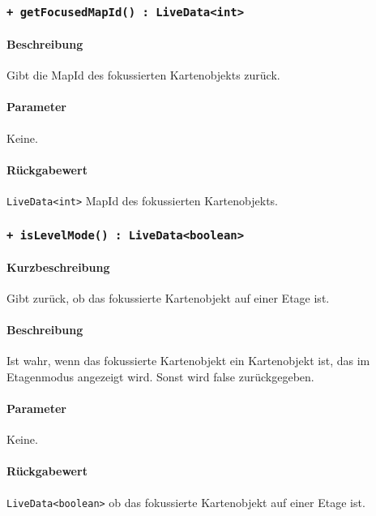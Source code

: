 \subsubsection*{\texttt{+ getFocusedMapId() : LiveData<int>}}\label{App_Map_ViewModel_getFocusedMapId}%
\paragraph*{Beschreibung}
Gibt die MapId des fokussierten Kartenobjekts zurück.
\paragraph*{Parameter}
Keine.
\paragraph*{Rückgabewert}
\texttt{LiveData<int>} MapId des fokussierten Kartenobjekts.

\subsubsection*{\texttt{+ isLevelMode() : LiveData<boolean>}}\label{App_Map_ViewModel_isLevelMode}%
\paragraph*{Kurzbeschreibung}
Gibt zurück, ob das fokussierte Kartenobjekt auf einer Etage ist.
\paragraph*{Beschreibung}
Ist wahr, wenn das fokussierte Kartenobjekt ein Kartenobjekt ist, das im Etagenmodus 
angezeigt wird. Sonst wird false zurückgegeben.
\paragraph*{Parameter}
Keine.
\paragraph*{Rückgabewert}
\texttt{LiveData<boolean>} ob das fokussierte Kartenobjekt auf einer Etage ist.